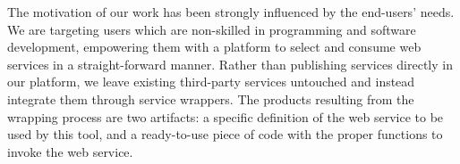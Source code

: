 The motivation of our work has been strongly influenced by the end-users' needs. We are targeting users which are non-skilled in programming and software development, empowering them with a platform to select and consume web services in a straight-forward manner.
Rather than publishing services directly in our platform, we leave existing third-party services untouched and instead integrate them through service wrappers. The products resulting from the wrapping process are two artifacts: a specific definition of the web service to be used by this tool, and a ready-to-use piece of code with the proper functions to invoke the web service.


